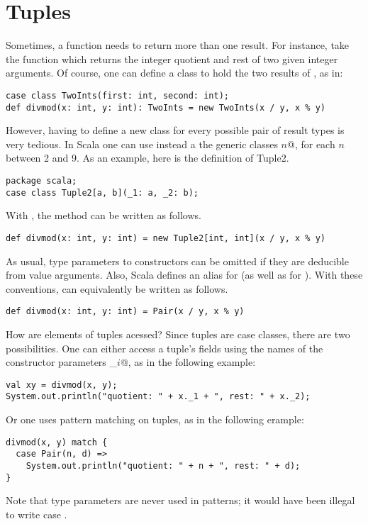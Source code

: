 \documentclass[a4paper,12pt,twoside,titlepage]{book}
\begin{document}
\section{Tuples}

Sometimes, a function needs to return more than one result. For
instance, take the function  which returns the integer quotient
and rest of two given integer arguments.  Of course, one can define a
class to hold the two results of , as in:
\begin{lstlisting}
case class TwoInts(first: int, second: int);
def divmod(x: int, y: int): TwoInts = new TwoInts(x / y, x % y)
\end{lstlisting}
However, having to define a new class for every possible pair of
result types is very tedious. In Scala one can use instead a
the generic classes \lstinline@Tuple$n$@, for each $n$ between
2 and 9.  As an example, here is the definition of Tuple2.
\begin{lstlisting}
package scala;
case class Tuple2[a, b](_1: a, _2: b);
\end{lstlisting}
With , the  method can be written as follows.
\begin{lstlisting}
def divmod(x: int, y: int) = new Tuple2[int, int](x / y, x % y)
\end{lstlisting}
As usual, type parameters to constructors can be omitted if they are
deducible from value arguments. Also, Scala defines an alias
 for  (as well as  for ).
With these conventions,  can equivalently be written as
follows.
\begin{lstlisting}
def divmod(x: int, y: int) = Pair(x / y, x % y)
\end{lstlisting}
How are elements of tuples acessed? Since tuples are case classes,
there are two possibilities. One can either access a tuple's fields
using the names of the constructor parameters \lstinline@_$i$@, as in the following example:
\begin{lstlisting}
val xy = divmod(x, y);
System.out.println("quotient: " + x._1 + ", rest: " + x._2);
\end{lstlisting}
Or one uses pattern matching on tuples, as in the following erample:
\begin{lstlisting}
divmod(x, y) match {
  case Pair(n, d) => 
    System.out.println("quotient: " + n + ", rest: " + d);
}
\end{lstlisting}
Note that type parameters are never used in patterns; it would have
been illegal to write case .
\end{document}
